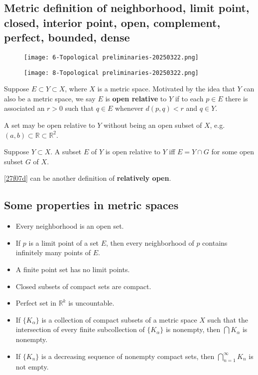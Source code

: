 \subsection{Metric definition of neighborhood, limit point, closed, interior point, open, complement, perfect, bounded, dense}

\begin{figure}[H]
\centering
\texttt{[image: 6-Topological preliminaries-20250322.png]}
\label{}
\end{figure}
\begin{figure}[H]
\centering
\texttt{[image: 8-Topological preliminaries-20250322.png]}
\label{}
\end{figure}

\begin{definition}
Suppose $E\subset Y\subset X$, where $X$ is a metric space. Motivated by the idea that $Y$ can also be a metric space, we say $E$ is \textbf{open relative} to $Y$ if to each $p\in E$ there is associated an $r>0$ such that $q\in E$ whenever $d(p,q)<r$ and $q\in Y$.
\end{definition}
A set may be open relative to $Y$ without being an open subset of $X$, e.g. $(a,b)\subset \mathbb{R}\subset \mathbb{R}^{2}$.

\begin{theorem}
Suppose $Y\subset X$. A subset $E$ of $Y$ is open relative to $Y$ iff $E=Y\cap G$ for some open subset $G$ of $X$.\label{27f07d}
\end{theorem}

\cref{27f07d}  can be another definition of \textbf{relatively open}.

\subsection{Some properties in metric spaces}

\begin{itemize}
	\item Every neighborhood is an open set.
	\item If $p$ is a limit point of a set $E$, then every neighborhood of $p$ contains infinitely many points of $E$.
	\item A finite point set has no limit points.
	\item Closed subsets of compact sets are compact.
	\item Perfect set in $\mathbb{R}^{k}$ is uncountable.
	\item If $\{ K_{\alpha} \}$ is a collection of compact subsets of a metric space $X$ such that the intersection of every finite subcollection of $\{ K_{\alpha} \}$ is nonempty, then $\bigcap K_{\alpha}$ is nonempty.
	\item If $\{ K_n \}$ is a decreasing sequence of nonempty compact sets, then $\bigcap_{n=1}^{\infty}K_n$ is not empty.
\end{itemize}

